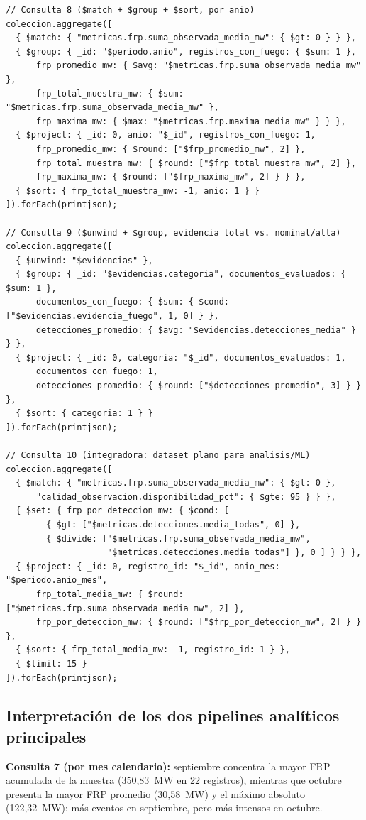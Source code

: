 \documentclass[11pt]{article}
\begin{document}
\begin{lstlisting}
// Consulta 8 ($match + $group + $sort, por anio)
coleccion.aggregate([
  { $match: { "metricas.frp.suma_observada_media_mw": { $gt: 0 } } },
  { $group: { _id: "$periodo.anio", registros_con_fuego: { $sum: 1 },
      frp_promedio_mw: { $avg: "$metricas.frp.suma_observada_media_mw" },
      frp_total_muestra_mw: { $sum: "$metricas.frp.suma_observada_media_mw" },
      frp_maxima_mw: { $max: "$metricas.frp.maxima_media_mw" } } },
  { $project: { _id: 0, anio: "$_id", registros_con_fuego: 1,
      frp_promedio_mw: { $round: ["$frp_promedio_mw", 2] },
      frp_total_muestra_mw: { $round: ["$frp_total_muestra_mw", 2] },
      frp_maxima_mw: { $round: ["$frp_maxima_mw", 2] } } },
  { $sort: { frp_total_muestra_mw: -1, anio: 1 } }
]).forEach(printjson);

// Consulta 9 ($unwind + $group, evidencia total vs. nominal/alta)
coleccion.aggregate([
  { $unwind: "$evidencias" },
  { $group: { _id: "$evidencias.categoria", documentos_evaluados: { $sum: 1 },
      documentos_con_fuego: { $sum: { $cond: ["$evidencias.evidencia_fuego", 1, 0] } },
      detecciones_promedio: { $avg: "$evidencias.detecciones_media" } } },
  { $project: { _id: 0, categoria: "$_id", documentos_evaluados: 1,
      documentos_con_fuego: 1,
      detecciones_promedio: { $round: ["$detecciones_promedio", 3] } } },
  { $sort: { categoria: 1 } }
]).forEach(printjson);

// Consulta 10 (integradora: dataset plano para analisis/ML)
coleccion.aggregate([
  { $match: { "metricas.frp.suma_observada_media_mw": { $gt: 0 },
      "calidad_observacion.disponibilidad_pct": { $gte: 95 } } },
  { $set: { frp_por_deteccion_mw: { $cond: [
        { $gt: ["$metricas.detecciones.media_todas", 0] },
        { $divide: ["$metricas.frp.suma_observada_media_mw",
                    "$metricas.detecciones.media_todas"] }, 0 ] } } },
  { $project: { _id: 0, registro_id: "$_id", anio_mes: "$periodo.anio_mes",
      frp_total_media_mw: { $round: ["$metricas.frp.suma_observada_media_mw", 2] },
      frp_por_deteccion_mw: { $round: ["$frp_por_deteccion_mw", 2] } } },
  { $sort: { frp_total_media_mw: -1, registro_id: 1 } },
  { $limit: 15 }
]).forEach(printjson);
\end{lstlisting}

\subsection{Interpretación de los dos pipelines analíticos principales}

\textbf{Consulta 7 (por mes calendario):} septiembre concentra la mayor FRP
acumulada de la muestra (350,83~MW en 22 registros), mientras que octubre
presenta la mayor FRP promedio (30,58~MW) y el máximo absoluto
(122,32~MW): más eventos en septiembre, pero más intensos en octubre.
\end{document}
